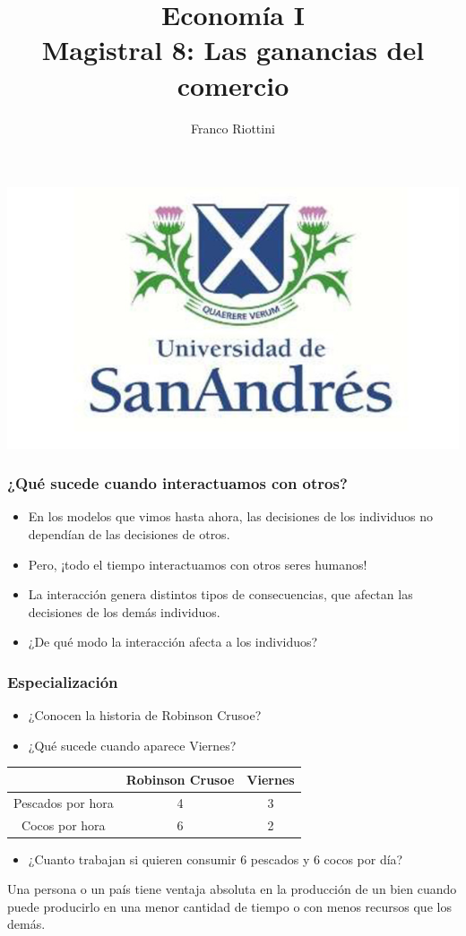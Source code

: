 \documentclass{beamer}
\title[Economía I]{Economía I \vspace{4mm}
\\ Magistral 8: Las ganancias del comercio}
\date{}
\author[Riottini]{Franco Riottini}
\institute[]{Universidad de San Andrés}
\begin{document}
\begin{frame}
\titlepage
\centering
\includegraphics[scale=0.2]{../Figures/logoUDESA.jpg} 
\end{frame}


\begin{frame}
\frametitle{¿Qué sucede cuando interactuamos con otros?}
\begin{itemize}
    \item En los modelos que vimos hasta ahora, las decisiones de los individuos no dependían de las decisiones de otros.
    \item Pero, ¡todo el tiempo interactuamos con otros seres humanos!
    \item La interacción genera distintos tipos de consecuencias, que afectan las decisiones de los demás individuos.
    \item ¿De qué modo la interacción afecta a los individuos? 
\end{itemize} 
\end{frame}

\begin{frame}
\frametitle{Especialización}
    \begin{itemize}
        \item ¿Conocen la historia de Robinson Crusoe?
        \item ¿Qué sucede cuando aparece Viernes?  
    \end{itemize}
    \centering \vspace{4mm}
    \begin{tabular}{|c|c|c|} \hline
    & Robinson Crusoe & Viernes \\ \hline
    Pescados por hora   & 4 & 3 \\ \hline
    Cocos por hora   & 6 & 2 \\ \hline     
    \end{tabular}
    \begin{itemize}\vspace{4mm}
        \item ¿Cuanto trabajan si quieren consumir 6 pescados y 6 cocos por día? 
    \end{itemize}
    \begin{boxA}
    \centering
    Una persona o un país tiene ventaja absoluta en la producción de
    un bien cuando puede producirlo en una menor cantidad de
    tiempo o con menos recursos que los demás.
    \end{boxA}
\end{frame}
\end{document}
